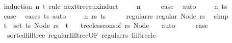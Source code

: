 \begin{isabellebody}
%
\isadelimproof
%
\endisadelimproof
%
\isatagproof
{}\isamarkupfalse%
\ {\isacharparenleft}{\kern0pt}induction\ n\ t\ rule{\isacharcolon}{\kern0pt}\ next{\isacharunderscore}{\kern0pt}tree{\isacharunderscore}{\kern0pt}aux{\isachardot}{\kern0pt}induct{\isacharparenright}{\kern0pt}\isanewline
\ \ \isamarkupfalse%
\ {\isacharparenleft}{\kern0pt}{}\ n{\isacharparenright}{\kern0pt}\isanewline
\ \ \isamarkupfalse%
\ \isamarkupfalse%
\ {\isacharquery}{\kern0pt}case\ \isamarkupfalse%
\ auto\isanewline
{}\isamarkupfalse%
\isanewline
\ \ \isamarkupfalse%
\ {\isacharparenleft}{\kern0pt}{}\ n\ ts{\isacharparenright}{\kern0pt}\isanewline
\ \ \isamarkupfalse%
\ \isamarkupfalse%
\ {\isacharquery}{\kern0pt}case\ \isamarkupfalse%
\ {\isacharparenleft}{\kern0pt}cases\ ts{\isacharparenright}{\kern0pt}\ auto\isanewline
{}\isamarkupfalse%
\isanewline
\ \ \isamarkupfalse%
\ {\isacharparenleft}{\kern0pt}{}\ n\ rs\ ts{\isacharparenright}{\kern0pt}\isanewline
\ \ \isamarkupfalse%
\ \isamarkupfalse%
\ regular{\isacharunderscore}{\kern0pt}rs{\isacharcolon}{\kern0pt}\ {\isachardoublequoteopen}regular\ {\isacharparenleft}{\kern0pt}Node\ rs{\isacharparenright}{\kern0pt}{\isachardoublequoteclose}\ \isamarkupfalse%
\ simp\isanewline
\ \ \isamarkupfalse%
\ {\isachardoublequoteopen}{\isasymforall}t\ {\isasymin}\ set\ ts{\isachardot}{\kern0pt}\ Node\ {\isacharparenleft}{\kern0pt}rs{\isacharparenright}{\kern0pt}\ {\isacharless}{\kern0pt}\ t{\isachardoublequoteclose}\ \isamarkupfalse%
\ {}{\isacharparenleft}{\kern0pt}{}{\isacharparenright}{\kern0pt}\ tree{\isacharunderscore}{\kern0pt}less{\isacharunderscore}{\kern0pt}cons{\isacharbrackleft}{\kern0pt}of\ rs\ {\isachardoublequoteopen}Node\ {\isacharbrackleft}{\kern0pt}{\isacharbrackright}{\kern0pt}{\isachardoublequoteclose}{\isacharbrackright}{\kern0pt}\ \isamarkupfalse%
\ auto\isanewline
\ \ \isamarkupfalse%
\ \isamarkupfalse%
\ {\isacharquery}{\kern0pt}case\ \isamarkupfalse%
\ {}\ sorted{\isacharunderscore}{\kern0pt}fill{\isacharunderscore}{\kern0pt}tree\ regular{\isacharunderscore}{\kern0pt}fill{\isacharunderscore}{\kern0pt}tree{\isacharbrackleft}{\kern0pt}OF\ regular{\isacharunderscore}{\kern0pt}rs{\isacharbrackright}{\kern0pt}\ fill{\isacharunderscore}{\kern0pt}tree{\isacharunderscore}{\kern0pt}le\isanewline

\end{isabellebody}
